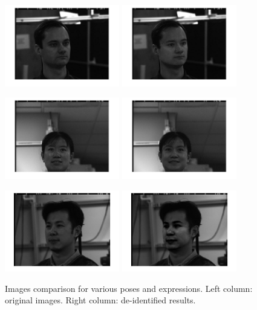\begin{figure}[!htb]
    \centering
    \includegraphics[width=50mm]{figure/02-1-1-o}
    \includegraphics[width=50mm]{figure/02-1-1.jpg}
    
    \includegraphics[width=50mm]{figure/01-2-2-o.jpg}
    \includegraphics[width=50mm]{figure/01-2-2.jpg}

    \includegraphics[width=50mm]{figure/59-SW07-o.jpg}
    \includegraphics[width=50mm]{figure/59-SW07.jpg}
    \caption{Images comparison for various poses and expressions. Left column: original 
            images. Right column: de-identified results.}
    \label{fig:app_comparison}
\end{figure}


